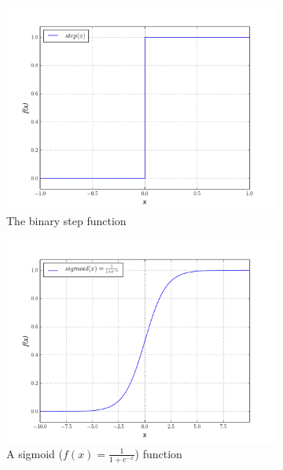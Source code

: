 \documentclass[10pt,a4paper,DIV=11]{scrreprt}
\begin{document}
\begin{figure}[H]

\centering
\begin{subfigure}{.5\textwidth}
  \centering
  \includegraphics[width=1.1\linewidth]{files/activation/step.pdf}
  \caption{The binary step function}
  \label{fig:plot1}
\end{subfigure}%
\begin{subfigure}{.5\textwidth}
  \centering
  \includegraphics[width=1.1\linewidth]{files/activation/sigmoid.pdf}
  \caption{A sigmoid ($f(x) = \frac{1}{1+e^{-x}}$) function}
  \label{fig:plot2}
\end{subfigure}
\newline
\begin{subfigure}{.5\textwidth}

\end{subfigure}
\end{figure}
\end{document}
